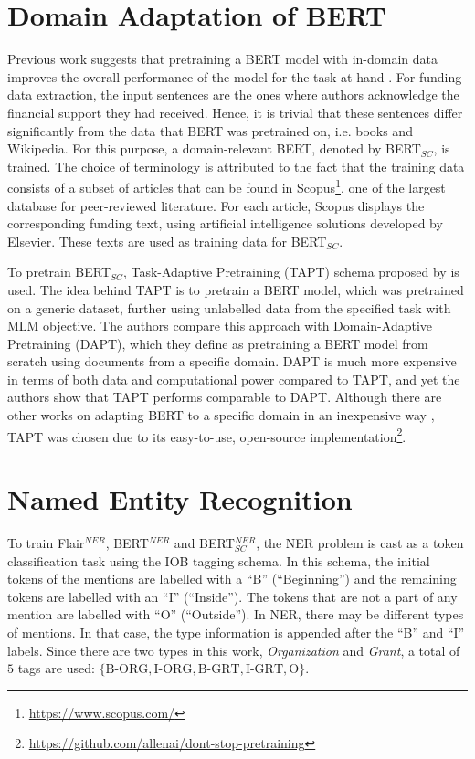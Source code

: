 \documentclass{report}
\theoremstyle{definition}
\theoremstyle{remark}
\begin{document}
\section{Domain Adaptation of BERT}
Previous work suggests that pretraining a BERT model with in-domain data improves the overall performance of the model for the task at hand \cite{DontStop,exBERT,quote3}. For funding data extraction, the input sentences are the ones where authors acknowledge the financial support they had received. Hence, it is trivial that these sentences differ significantly from the data that BERT was pretrained on, i.e. books and Wikipedia.  For this purpose, a domain-relevant BERT, denoted by BERT$_{SC}$, is trained. The choice of terminology is attributed to the fact that the training data consists of a subset of articles that can be found in Scopus\footnote{\url{https://www.scopus.com/}}, one of the largest database for peer-reviewed literature. For each article, Scopus displays the corresponding funding text, using artificial intelligence solutions developed by Elsevier. These texts are used as training data for BERT$_{SC}$.

To pretrain BERT$_{SC}$, Task-Adaptive Pretraining (TAPT) schema proposed by \cite{DontStop} is used. The idea behind TAPT is to pretrain a BERT model, which was pretrained on a generic dataset, further using unlabelled data from the specified task with MLM objective. The authors compare this approach with Domain-Adaptive Pretraining (DAPT), which they define as pretraining a BERT model from scratch using documents from a specific domain. DAPT is much more expensive in terms of both data and computational power compared to TAPT, and yet the authors show that TAPT performs comparable to DAPT. Although there are other works on adapting BERT to a specific domain in an inexpensive way \cite{exBERT,word2vectoBERT}, TAPT was chosen due to its easy-to-use, open-source implementation\footnote{\url{https://github.com/allenai/dont-stop-pretraining}}.


\section{Named Entity Recognition}
\label{sec:NERMEThod}

To train  Flair$^{NER}$, BERT$^{NER}$ and BERT$^{NER}_{SC}$, the NER problem is cast as a token classification task using the IOB tagging schema. In this schema, the initial tokens of the mentions are labelled with a ``B'' (``Beginning'') and the remaining tokens are labelled with an ``I'' (``Inside''). The tokens that are not a part of any mention are labelled with ``O'' (``Outside''). In NER, there may be different types of mentions. In that case, the type information is appended after the ``B'' and ``I'' labels. Since there are two types in this work, \textit{Organization} and \textit{Grant}, a total of $5$ tags are used: $\{ \text{B-ORG}, \text{I-ORG}, \text{B-GRT}, \text{I-GRT}, \text{O} \}$.
\end{document}
